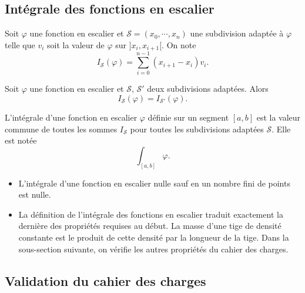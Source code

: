\subsection{Intégrale des fonctions en escalier}
\begin{nota}
 Soit $\varphi$ une fonction en escalier et $\mathcal S=(x_0,\cdots,x_n)$ une subdivision adaptée à $\varphi$ telle que $v_i$ soit la valeur de $\varphi$ sur $]x_i,x_{i+1}[$. On note
\begin{displaymath}
 I_\mathcal{S}(\varphi)= \sum_{i=0}^{n-1}(x_{i+1}-x_i)v_i.
\end{displaymath}
\end{nota}
\begin{propn}
 Soit $\varphi$ une fonction en escalier et $\mathcal S$, $\mathcal S'$ deux subdivisions adaptées. Alors
\begin{displaymath}
 I_\mathcal{S}(\varphi)=I_{\mathcal{S}'}(\varphi).
\end{displaymath}
\end{propn}
\begin{defi}
 L'intégrale d'une fonction en escalier $\varphi$ définie sur un segment $[a,b]$ est la valeur commune de toutes les sommes $I_\mathcal{S}$ pour toutes les subdivisions adaptées $\mathcal S$. Elle est notée
\begin{displaymath}
 \int_{[a,b]}\varphi.
\end{displaymath}
\end{defi}
\begin{rems}
 \begin{itemize}
  \item L'intégrale d'une fonction en escalier nulle sauf en un nombre fini de points est nulle.
  \item La définition de l'intégrale des fonctions en escalier traduit exactement la dernière des propriétés requises au début. La masse d'une tige de densité constante est le produit de cette densité par la longueur de la tige. Dans la sous-section suivante, on vérifie les autres propriétés du cahier des charges.
 \end{itemize}
\end{rems}

\subsection{Validation du cahier des charges}
